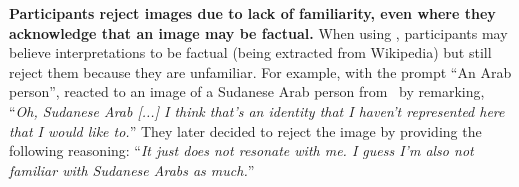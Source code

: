 \textbf{Participants reject images due to lack of familiarity, even where they acknowledge that an image may be factual.} 
When using \agonistic, participants may believe interpretations to be factual (being extracted from Wikipedia) but still reject them because they are unfamiliar. 
For example, with the prompt ``An Arab person'',  reacted to an image of a Sudanese Arab person from \agonistic~by remarking, ``\textit{Oh, Sudanese Arab [...] I think that's an identity that I haven't represented here that I would like to.}'' 
They later decided to reject the image by providing the following reasoning: ``\textit{It just does not resonate with me. I guess I'm also not familiar with Sudanese Arabs as much.}''
















